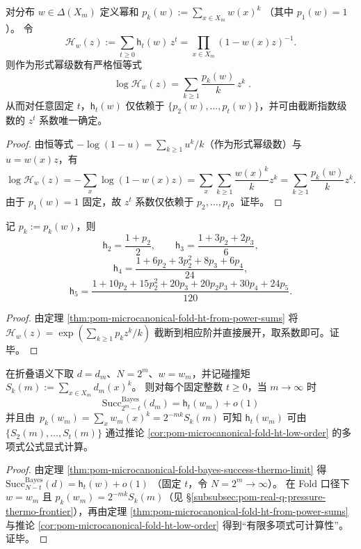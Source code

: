 \begin{theorem}\label{thm:pom-microcanonical-fold-ht-from-power-sums}
对分布 \(w\in\Delta(X_m)\) 定义幂和
\(
p_k(w):=\sum_{x\in X_m}w(x)^k
\)
（其中 \(p_1(w)=1\)）。
令
\[
\mathcal{H}_w(z):=\sum_{t\ge 0}\mathsf{h}_t(w)\,z^t=\prod_{x\in X_m}(1-w(x)z)^{-1}.
\]
则作为形式幂级数有严格恒等式
\[
\boxed{\;
\log \mathcal{H}_w(z)=\sum_{k\ge 1}\frac{p_k(w)}{k}\,z^k\; } .
\]
从而对任意固定 \(t\)，\(\mathsf{h}_t(w)\) 仅依赖于 \(\{p_2(w),\dots,p_t(w)\}\)，并可由截断指数级数的 \(z^t\) 系数唯一确定。
\end{theorem}
\begin{proof}
由恒等式 \(-\log(1-u)=\sum_{k\ge 1}u^k/k\)（作为形式幂级数）与 \(u=w(x)z\)，有
\[
\log \mathcal{H}_w(z)
=-\sum_{x}\log(1-w(x)z)
=\sum_{x}\sum_{k\ge 1}\frac{w(x)^k}{k}z^k
=\sum_{k\ge 1}\frac{p_k(w)}{k}z^k.
\]
由于 \(p_1(w)=1\) 固定，故 \(z^t\) 系数仅依赖于 \(p_2,\dots,p_t\)。证毕。
\end{proof}

\begin{corollary}[低阶显式公式]\label{cor:pom-microcanonical-fold-ht-low-order}
记 \(p_k:=p_k(w)\)，则
\[
\mathsf{h}_2=\frac{1+p_2}{2},\qquad
\mathsf{h}_3=\frac{1+3p_2+2p_3}{6},
\]
\[
\mathsf{h}_4=\frac{1+6p_2+3p_2^2+8p_3+6p_4}{24},
\]
\[
\mathsf{h}_5=\frac{1+10p_2+15p_2^2+20p_3+20p_2p_3+30p_4+24p_5}{120}.
\]
\end{corollary}
\begin{proof}
由定理 \ref{thm:pom-microcanonical-fold-ht-from-power-sums} 将
\(
\mathcal{H}_w(z)=\exp(\sum_{k\ge 1}p_k z^k/k)
\)
截断到相应阶并直接展开，取系数即可。证毕。
\end{proof}

\begin{theorem}\label{thm:pom-microcanonical-fold-bayes-success-polynomial-in-moments}
在折叠语义下取 \(d=d_m\)、\(N=2^m\)、\(w=w_m\)，并记碰撞矩
\(
S_k(m):=\sum_{x\in X_m}d_m(x)^k
\)。
则对每个固定整数 \(t\ge 0\)，当 \(m\to\infty\) 时
\[
\boxed{\;
\mathrm{Succ}^{\mathrm{Bayes}}_{2^m-t}(d_m)=\mathsf{h}_t(w_m)+o(1)\;}
\]
并且由 \(\,p_k(w_m)=\sum_x w_m(x)^k=2^{-mk}S_k(m)\) 可知 \(\mathsf{h}_t(w_m)\) 可由
\(\{S_2(m),\dots,S_t(m)\}\) 通过推论 \ref{cor:pom-microcanonical-fold-ht-low-order} 的多项式公式显式计算。
\end{theorem}
\begin{proof}
由定理 \ref{thm:pom-microcanonical-fold-bayes-success-thermo-limit} 得
\(
\mathrm{Succ}^{\mathrm{Bayes}}_{N-t}(d)=\mathsf{h}_t(w)+o(1)
\)
（固定 \(t\)，令 \(N=2^m\to\infty\)）。
在 Fold 口径下 \(w=w_m\) 且 \(p_k(w_m)=2^{-mk}S_k(m)\)（见 \S\ref{subsubsec:pom-real-q-pressure-thermo-frontier}），再由定理 \ref{thm:pom-microcanonical-fold-ht-from-power-sums} 与推论 \ref{cor:pom-microcanonical-fold-ht-low-order} 得到“有限多项式可计算性”。证毕。
\end{proof}

